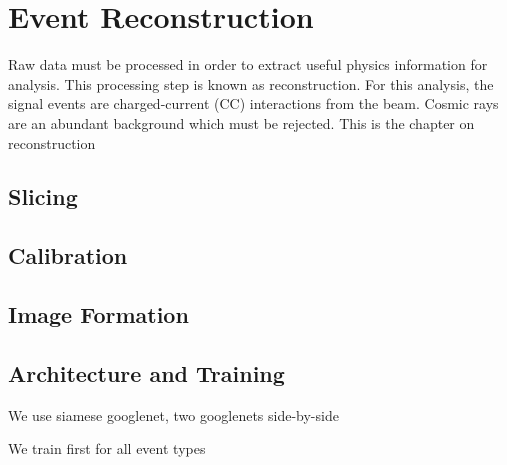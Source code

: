 \chapter{Event Reconstruction}
\label{reconstruction_chapter}

Raw data must be processed in order to extract useful physics information for analysis.
This processing step is known as reconstruction.
For this analysis, the signal events are charged-current (CC) \numu  interactions from the \numi beam.  Cosmic rays are an abundant background which must be rejected.
This is the chapter on reconstruction


\section{Slicing}

\section{Calibration}


\section{Image Formation}

\section{Architecture and Training}

We use siamese googlenet, two googlenets side-by-side

We train first for all event types



